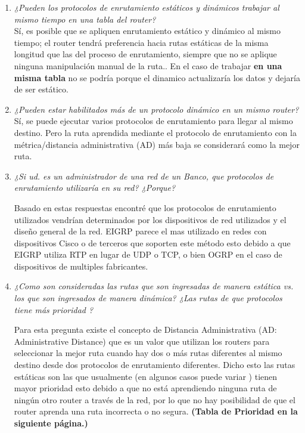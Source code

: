 
\begin{enumerate}
\item {\color{red}\textit{¿Pueden  los protocolos de enrutamiento estáticos y dinámicos trabajar al mismo tiempo en una tabla del router?}}\\
Sí, es posible que se apliquen enrutamiento estático y dinámico al mismo tiempo; el router tendrá preferencia hacia rutas estáticas de la misma longitud que las del proceso de enrutamiento, siempre que no se aplique ninguna manipulación manual de la ruta.\cite{routing6}. En el caso de trabajar \textbf{en una misma tabla}
no se podría porque el dinamico actualizaría los datos y dejaría de ser estático.
\item {\color{red}\textit{¿Pueden estar habilitados más de un protocolo dinámico en un mismo  router?}}\\
Sí, se puede ejecutar varios protocolos de enrutamiento para llegar al mismo destino. Pero la ruta aprendida mediante el protocolo de enrutamiento con la métrica/distancia administrativa (AD) más baja se considerará como la mejor ruta.
\item {\color{red}\textit{¿Si ud. es un administrador de una red de un Banco, que protocolos de enrutamiento utilizaría en su red? ¿Porque?}}

Basado en estas respuestas encontré \cite{protos}\cite{protos2} que  los protocolos de enrutamiento utilizados vendrían determinados por los dispositivos de red utilizados y el diseño general de la red. EIGRP parece el mas utilizado en redes con dispositivos Cisco o de terceros que soporten este método esto debido a que EIGRP utiliza RTP en lugar de UDP o TCP, o bien OGRP en el caso de dispositivos de multiples fabricantes.

\item {\color{red}\textit{¿Como son consideradas las rutas que son ingresadas de manera estática vs. los que son ingresados de manera dinámica? ¿Las rutas de que protocolos tiene más prioridad ?}}

Para esta pregunta existe el concepto de Distancia Administrativa
(AD: Administrative Distance) que es un valor que utilizan los routers para seleccionar la mejor ruta cuando hay dos o más rutas diferentes al mismo destino desde dos protocolos de enrutamiento diferentes.\cite{routing3} Dicho esto las rutas estáticas son las que usualmente (en algunos casos puede variar \cite{routing4}) tienen mayor prioridad esto debido a que no está aprendiendo ninguna ruta de ningún otro router a través de la red, por lo que no hay posibilidad de que el router aprenda una ruta incorrecta o no segura.\cite{routing2} \textbf{(Tabla de Prioridad en la siguiente página.)}





\end{enumerate}
